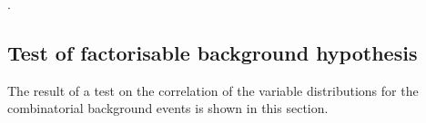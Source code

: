 .

\subsection{Test of factorisable background hypothesis}
\label{sec:fact}

The result of a test on the correlation of the variable distributions for the combinatorial background events is shown in this section.

